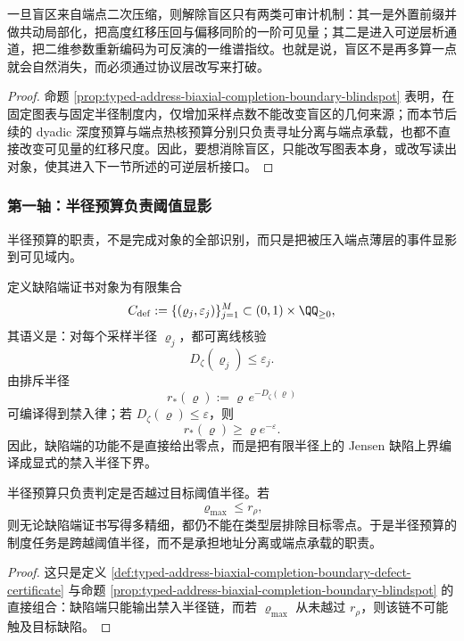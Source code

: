 \begin{proposition}[破盲只有两类协议改写]\label{prop:typed-address-biaxial-completion-boundary-unblind-paths}
一旦盲区来自端点二次压缩，则解除盲区只有两类可审计机制：其一是外置前缀并做共动局部化，把高度红移压回与偏移同阶的一阶可见量；其二是进入可逆层析通道，把二维参数重新编码为可反演的一维谱指纹。也就是说，盲区不是再多算一点就会自然消失，而必须通过协议层改写来打破。
\end{proposition}
\begin{proof}
命题 \ref{prop:typed-address-biaxial-completion-boundary-blindspot} 表明，在固定图表与固定半径制度内，仅增加采样点数不能改变盲区的几何来源；而本节后续的 dyadic 深度预算与端点热核预算分别只负责寻址分离与端点承载，也都不直接改变可见量的红移尺度。因此，要想消除盲区，只能改写图表本身，或改写读出对象，使其进入下一节所述的可逆层析接口。
\end{proof}

\subsubsection{第一轴：半径预算负责阈值显影}\label{subsubsec:typed-address-biaxial-completion-boundary-radius}
半径预算的职责，不是完成对象的全部识别，而只是把被压入端点薄层的事件显影到可见域内。

\begin{definition}[缺陷端证书]\label{def:typed-address-biaxial-completion-boundary-defect-certificate}
定义缺陷端证书对象为有限集合
\[
C_{\mathrm{def}}
:=
\{(\varrho_j,\varepsilon_j)\}_{j=1}^{M}
\subset (0,1)\times\QQ_{\ge 0},
\]
其语义是：对每个采样半径 \(\varrho_j\)，都可离线核验
\[
D_{\zeta}(\varrho_j)\le \varepsilon_j.
\]
由排斥半径
\[
r_{\ast}(\varrho):=\varrho\,e^{-D_{\zeta}(\varrho)}
\]
可编译得到禁入律；若 \(D_{\zeta}(\varrho)\le \varepsilon\)，则
\[
r_{\ast}(\varrho)\ge \varrho e^{-\varepsilon}.
\]
因此，缺陷端的功能不是直接给出零点，而是把有限半径上的 Jensen 缺陷上界编译成显式的禁入半径下界。
\end{definition}

\begin{corollary}[半径预算的任务边界]\label{cor:typed-address-biaxial-completion-boundary-radius-role}
半径预算只负责判定是否越过目标阈值半径。若
\[
\varrho_{\max}\le r_{\rho},
\]
则无论缺陷端证书写得多精细，都仍不能在类型层排除目标零点。于是半径预算的制度任务是跨越阈值半径，而不是承担地址分离或端点承载的职责。
\end{corollary}
\begin{proof}
这只是定义 \ref{def:typed-address-biaxial-completion-boundary-defect-certificate} 与命题 \ref{prop:typed-address-biaxial-completion-boundary-blindspot} 的直接组合：缺陷端只能输出禁入半径链，而若 \(\varrho_{\max}\) 从未越过 \(r_{\rho}\)，则该链不可能触及目标缺陷。
\end{proof}


